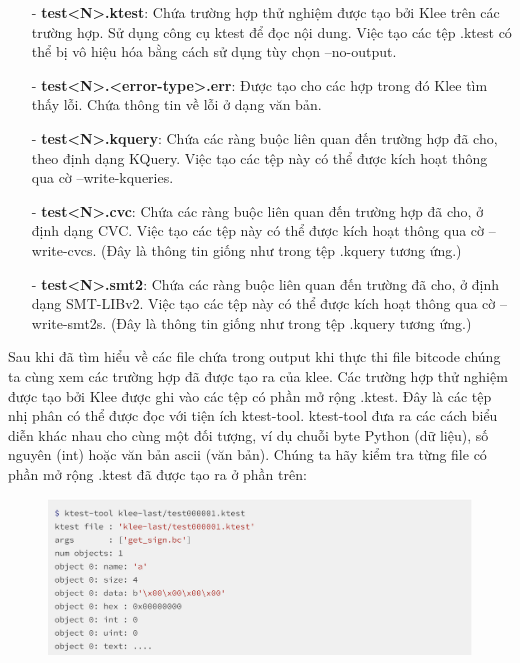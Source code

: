 \documentclass[12pt,a4paper]{article}
\begin{document}
\begin{itemize}
\item[-] \textbf{test<N>.ktest}: Chứa trường hợp thử nghiệm được tạo bởi Klee trên các trường hợp. Sử dụng công cụ ktest để đọc nội dung. Việc tạo các tệp .ktest có thể bị vô hiệu hóa bằng cách sử dụng tùy chọn --no-output.
\item[-] \textbf{test<N>.<error-type>.err}: Được tạo cho các  hợp trong đó Klee tìm thấy lỗi. Chứa thông tin về lỗi ở dạng văn bản.
\item[-] \textbf{test<N>.kquery}: Chứa các ràng buộc liên quan đến trường hợp đã cho, theo định dạng KQuery. Việc tạo các tệp này có thể được kích hoạt thông qua cờ --write-kqueries.
\item[-] \textbf{test<N>.cvc}: Chứa các ràng buộc liên quan đến trường hợp đã cho, ở định dạng CVC. Việc tạo các tệp này có thể được kích hoạt thông qua cờ --write-cvcs. (Đây là thông tin giống như trong tệp .kquery tương ứng.)
\item[-] \textbf{test<N>.smt2}: Chứa các ràng buộc liên quan đến trường đã cho, ở định dạng SMT-LIBv2. Việc tạo các tệp này có thể được kích hoạt thông qua cờ --write-smt2s. (Đây là thông tin giống như trong tệp .kquery tương ứng.)
\end{itemize}

Sau khi đã tìm hiểu về các file chứa trong output khi thực thi file bitcode chúng ta cùng xem các trường hợp đã được tạo ra của klee. Các trường hợp thử nghiệm được tạo bởi Klee được ghi vào các tệp có phần mở rộng .ktest. Đây là các tệp nhị phân có thể được đọc với tiện ích ktest-tool. ktest-tool đưa ra các cách biểu diễn khác nhau cho cùng một đối tượng, ví dụ chuỗi byte Python (dữ liệu), số nguyên (int) hoặc văn bản ascii (văn bản). Chúng ta hãy kiểm tra từng file có phần mở rộng .ktest đã được tạo ra ở phần trên:

\begin{figure}[ht]
\begin{center}
\includegraphics[scale=.3]{hinhanh/test1.png}
\end{center}
\end{figure}
\end{document}
